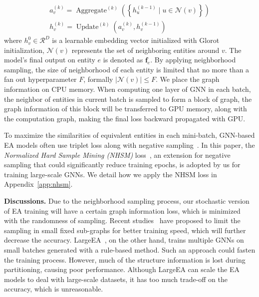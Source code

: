 \vspace{-3mm}
\begin{equation}
\begin{array}{c}
a_{v}^{(k)}=\operatorname{Aggregate}^{(k)}(\left\{h_{u}^{(k-1)} \mid u \in \mathcal{N}(v)\right\}) \\
h_{v}^{(k)}=\operatorname{Update}^{(k)}(a_{v}^{(k)}, h_{v}^{(k-1)})
\end{array}
\label{eq:message_passing}
\end{equation}
where $h_v^0 \in \mathcal{R}^D$ is a learnable embedding vector initialized with Glorot initialization,
$\mathcal{N}(v)$ represents the set of neighboring entities around $v$. The model's final output on entity $e$ is denoted as $\mathbf{f}_e$. By applying neighborhood sampling, the size of neighborhood of each entity is limited that no more than a fan out hyperparameter $F$, formally $|\mathcal{N}(v)|\leq F$. We place the graph information on CPU memory. When computing one layer of GNN in each batch, the neighbor of entities in current batch is sampled to form a block of graph, the graph information of this block will be transferred to GPU memory, along with the computation graph, making the final loss backward propagated with GPU.

To maximize the similarities of equivalent entities in each mini-batch, GNN-based EA models often use triplet loss along with negative sampling~\cite{GCN-Align18, KECG19, RREA20, MRAEA20}. In this paper, the \emph{Normalized Hard Sample Mining (NHSM)} loss~\cite{DualAMN21}, an extension for negative sampling that could significantly reduce training epochs, is adopted by us for training large-scale GNNs. We detail how we apply the NHSM loss in Appendix~\ref{app:nhsm}. 


\noindent
\textbf{Discussions.}
Due to the neighborhood sampling process, our stochastic version of EA training will have a certain graph information loss, which is minimized with the randomness of sampling. Recent studies~\cite{ClusterGCN} have proposed to limit the sampling in small fixed sub-graphs for better training speed, which will further decrease the accuracy. 
LargeEA~\cite{LargeEA22}, on the other hand, trains multiple GNNs on small batches generated with a rule-based method. Such an approach could fasten the training process. However, much of the structure information is lost during partitioning, causing poor performance. Although LargeEA can scale the EA models to deal with large-scale datasets, it has too much trade-off on the accuracy, which is unreasonable.  



